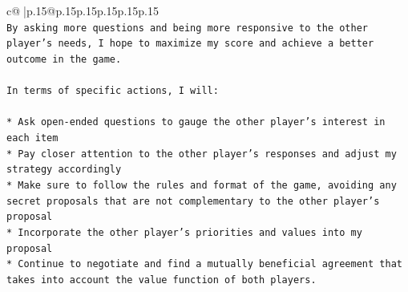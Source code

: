 \documentclass{article}
\begin{document}
{\begin{supertabular}{c@{$\;$}|p{.15\linewidth}@{}p{.15\linewidth}p{.15\linewidth}p{.15\linewidth}p{.15\linewidth}p{.15\linewidth}}
{{{\\ 
\texttt{By asking more questions and being more responsive to the other player's needs, I hope to maximize my score and achieve a better outcome in the game.} \\
\\ 
\texttt{In terms of specific actions, I will:} \\
\\ 
\texttt{* Ask open{-}ended questions to gauge the other player's interest in each item} \\
\texttt{* Pay closer attention to the other player's responses and adjust my strategy accordingly} \\
\texttt{* Make sure to follow the rules and format of the game, avoiding any secret proposals that are not complementary to the other player's proposal} \\
\texttt{* Incorporate the other player's priorities and values into my proposal} \\
\texttt{* Continue to negotiate and find a mutually beneficial agreement that takes into account the value function of both players.} \\
            }
        }
    }
     \\ \\

\end{supertabular}
}
\end{document}
